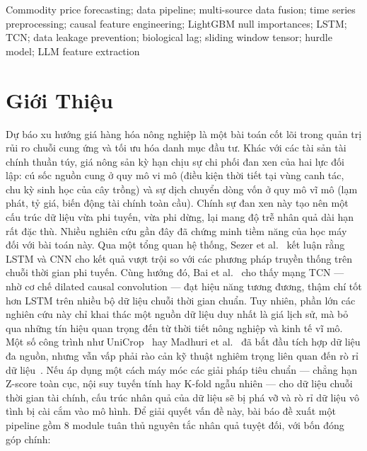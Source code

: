 \documentclass[conference]{IEEEtran}
\begin{document}
\begin{IEEEkeywords}
Commodity price forecasting; data pipeline; multi-source data fusion; time
series preprocessing; causal feature engineering; LightGBM null importances;
LSTM; TCN; data leakage prevention; biological lag; sliding window tensor;
hurdle model; LLM feature extraction
\end{IEEEkeywords}
\section{Giới Thiệu}
Dự báo xu hướng giá hàng hóa nông nghiệp là một bài toán cốt lõi trong quản
trị rủi ro chuỗi cung ứng và tối ưu hóa danh mục đầu tư. Khác với các tài
sản tài chính thuần túy, giá nông sản kỳ hạn chịu sự chi phối đan xen của hai
lực đối lập: cú sốc nguồn cung ở quy mô vi mô (điều kiện thời tiết tại vùng
canh tác, chu kỳ sinh học của cây trồng) và sự dịch chuyển dòng vốn ở quy mô
vĩ mô (lạm phát, tỷ giá, biến động tài chính toàn cầu). Chính sự đan xen này
tạo nên một cấu trúc dữ liệu vừa phi tuyến, vừa phi dừng, lại mang độ trễ
nhân quả dài hạn rất đặc thù.
Nhiều nghiên cứu gần đây đã chứng minh tiềm năng của học máy đối với bài
toán này. Qua một tổng quan hệ thống, Sezer et al.~\cite{sezer2020} kết luận
rằng LSTM và CNN cho kết quả vượt trội so với các phương pháp truyền thống
trên chuỗi thời gian phi tuyến. Cùng hướng đó, Bai et al.~\cite{bai2018} cho
thấy mạng TCN --- nhờ cơ chế dilated causal convolution --- đạt hiệu năng
tương đương, thậm chí tốt hơn LSTM trên nhiều bộ dữ liệu chuỗi thời gian
chuẩn.
Tuy nhiên, phần lớn các nghiên cứu này chỉ khai thác một nguồn dữ liệu duy
nhất là giá lịch sử, mà bỏ qua những tín hiệu quan trọng đến từ thời tiết
nông nghiệp và kinh tế vĩ mô. Một số công trình như UniCrop~\cite{khidirova2026}
hay Madhuri et al.~\cite{madhuri2025} đã bắt đầu tích hợp dữ liệu đa nguồn,
nhưng vẫn vấp phải rào cản kỹ thuật nghiêm trọng liên quan đến rò rỉ dữ
liệu~\cite{kaufman2012,roberts2022}.
Nếu áp dụng một cách máy móc các giải pháp tiêu chuẩn --- chẳng hạn Z-score
toàn cục, nội suy tuyến tính hay K-fold ngẫu nhiên --- cho dữ liệu chuỗi
thời gian tài chính, cấu trúc nhân quả của dữ liệu sẽ bị phá vỡ và rò rỉ dữ
liệu vô tình bị cài cắm vào mô hình. Để giải quyết vấn đề này, bài báo đề
xuất một pipeline gồm 8 module tuân thủ nguyên tắc nhân quả tuyệt đối, với
bốn đóng góp chính:
\end{document}
